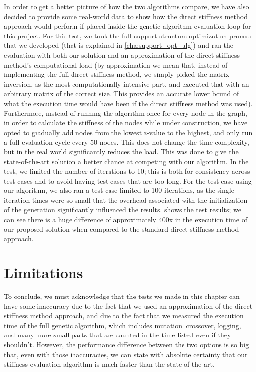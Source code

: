 In order to get a better picture of how the two algorithms compare, we have 
also decided to provide some real-world data to show how the direct stiffness method
approach would perform if placed inside the genetic algorithm evaluation loop for this project.
For this test, we took the full support structure optimization process that we developed (that is explained
in \cref{cha:support_opt_alg}) and ran the evaluation with both our solution and an
approximation of the direct stiffness method's computational load (by approximation we mean that,
instead of implementing the full direct stiffness method, we simply picked the matrix inversion, as
the most computationally intensive part, and executed that with an arbitrary matrix of the correct size.
This provides an accurate lower bound of what the execution time would have been if the direct stiffness
method was used). Furthermore, instead of running the algorithm once for every node in the graph, in order
to calculate the stiffness of the nodes while under construction, we have opted to gradually add nodes
from the lowest z-value to the highest, and only run a full evaluation cycle every 50 nodes.
This does not change the time complexity, but in the real world significantly reduces the load. This
was done to give the state-of-the-art solution a better chance at competing with our algorithm.
In the test, we limited the number of iterations to 10; this is both for consistency across test cases
and to avoid having test cases that are too long. For the test case using our algorithm, we also ran
a test case limited to 100 iterations, as the single iteration times were so small that the overhead
associated with the initialization of the generation significantly influenced the results.
 shows the test results; we can see there is a
huge difference of approximately 400x in the execution time of our proposed solution when compared to 
the standard direct stiffness method approach.

\section{Limitations}
To conclude, we must acknowledge that the tests we made in this chapter can have some inaccuracy due to the fact
that we used an approximation of the direct stiffness method approach, and due to the fact that we measured
the execution time of the full genetic algorithm, which includes mutation, crossover, logging, and many more
small parts that are counted in the time listed even if they shouldn't.
However, the performance difference between the two options is so big that, even with those inaccuracies,
we can state with absolute certainty that our stiffness evaluation algorithm is much faster than the state 
of the art.

